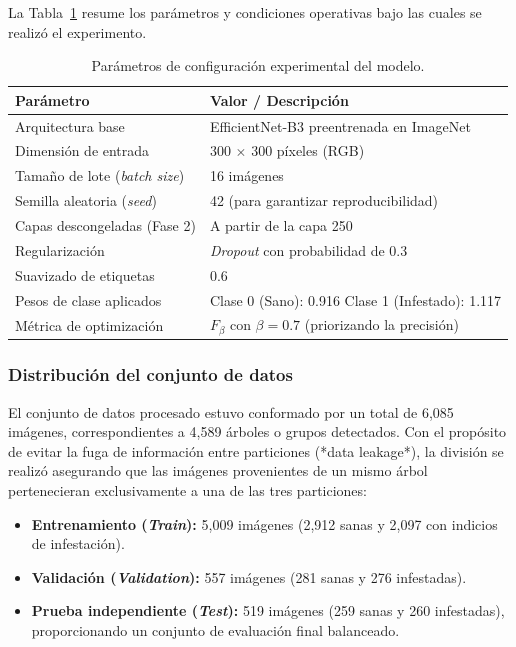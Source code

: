 La Tabla~\ref{tab:configuracion_entrenamiento} resume los parámetros y condiciones operativas bajo las cuales se realizó el experimento.

\begin{table}[H]
\centering
\caption{Parámetros de configuración experimental del modelo.}
\label{tab:configuracion_entrenamiento}
\renewcommand{\arraystretch}{1.2}
\begin{tabular}{|l|p{9.5cm}|}
\hline
\textbf{Parámetro} & \textbf{Valor / Descripción} \\
\hline
Arquitectura base & EfficientNet-B3 preentrenada en ImageNet \\
\hline
Dimensión de entrada & 300 $\times$ 300 píxeles (RGB) \\
\hline
Tamaño de lote (\textit{batch size}) & 16 imágenes \\
\hline
Semilla aleatoria (\textit{seed}) & 42 (para garantizar reproducibilidad) \\
\hline
Capas descongeladas (Fase 2) & A partir de la capa 250 \\
\hline
Regularización & \textit{Dropout} con probabilidad de 0.3 \\
\hline
Suavizado de etiquetas & 0.6 \\
\hline
Pesos de clase aplicados & Clase 0 (Sano): 0.916 \quad Clase 1 (Infestado): 1.117 \\
\hline
Métrica de optimización & $F_\beta$ con $\beta = 0.7$ (priorizando la precisión) \\
\hline
\end{tabular}
\end{table}

\subsubsection{Distribución del conjunto de datos}
\label{subsubsec:distribucion-datos}

El conjunto de datos procesado estuvo conformado por un total de 6,085 imágenes, correspondientes a 4,589 árboles o grupos detectados. Con el propósito de evitar la fuga de información entre particiones (*data leakage*), la división se realizó asegurando que las imágenes provenientes de un mismo árbol pertenecieran exclusivamente a una de las tres particiones:

\begin{itemize}
    \item \textbf{Entrenamiento (\textit{Train}):} 5,009 imágenes (2,912 sanas y 2,097 con indicios de infestación).
    \item \textbf{Validación (\textit{Validation}):} 557 imágenes (281 sanas y 276 infestadas).
    \item \textbf{Prueba independiente (\textit{Test}):} 519 imágenes (259 sanas y 260 infestadas), proporcionando un conjunto de evaluación final balanceado.
\end{itemize}

